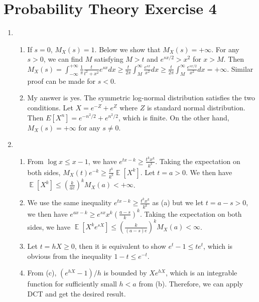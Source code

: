 \documentclass{article}
\DeclareMathOperator{\E}{\mathbb{E}}
\begin{document}
\section{Probability Theory Exercise 4}
\begin{enumerate}
\item 
\begin{enumerate}
    \item If $s=0$, $M_X(s)=1$. Below we show that $M_X(s)=+\infty$.
    For any $s>0$, we can find $M$ satisfying $M>t$ and $e^{sx/2}>x^2$ for $x>M$.
    Then $M_X(s) = \int_{-\infty}^{+\infty} \frac{1}{\pi} \frac{t}{t^2+x^2} e^{sx} dx
    \ge \frac{t}{2\pi} \int_{M}^{\infty} \frac{e^{sx}}{x^2}dx
    \ge \frac{t}{2\pi} \int_{M}^{\infty} \frac{e^{sx/2}}{x^2}dx = +\infty
    $. Similar proof can be made for $s<0$.
    \item My answer is yes. The symmetric log-normal distribution satisfies the two conditions.
    Let $X=e^{-Z}+e^{Z}$ where $Z$ is standard normal distribution. Then $E[X^n] = e^{-n^2/2}+e^{n^2/2}$,
    which is finite. On the other hand, $M_X(s) = +\infty$ for any $s\neq 0$.
\end{enumerate}
\item 
\begin{enumerate}
    \item From $\log x \leq x-1$, we have
    $e^{tx-k} \geq \frac{t^kx^k}{k^k}$.
    Taking the expectation on both sides, $M_X(t) e^{-k}
    \geq \frac{t^k}{k^k} \E[X^k]$.
    Let $t=a>0$. We then have $\E[X^k]\leq (\frac{k}{ae})^k M_X(a) < +\infty$.
    \item We use the same inequality $e^{tx-k} \geq \frac{t^kx^k}{k^k}$ as (a) but we let $t=a-s>0$, we then have
    $e^{ax-k} \geq e^{sx} x^k (\frac{a-s}{k})^k$. Taking the expectation on
    both sides, we have
    $\E[X^k e^{sX}] \leq (\frac{k}{(a-s)e})^k M_X(a) < \infty $.
    \item Let $ t = hX \geq 0$, then it is equivalent to show $e^t -1 \leq t e^t$,
    which is obvious from the inequality $1-t \leq e^{-t}$.
    \item From (c), $(e^{hX}-1)/h$ is bounded by $Xe^{hX}$, which is an integrable function for sufficiently small $h<a$ from (b). Therefore, we can apply DCT and get the desired result.
    

\end{enumerate}
\end{enumerate}
\end{document}
